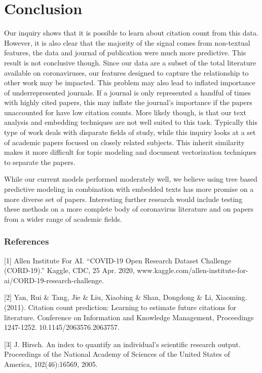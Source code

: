 \documentclass{article} %
\begin{document}
\section{Conclusion}
\label{conclusion}

Our inquiry shows that it is possible to learn about citation count from this data. However, it is also  clear that the majority of the signal comes from non-textual features, the data and journal of publication were much more predictive. This result is not conclusive though. Since our data are a subset of the total literature available on coronaviruses, our features designed to capture the relationship to other work may be impacted. This problem may also lead to inflated importance of underrepresented journals. If a journal is only represented a handful of times with highly cited papers, this may inflate the journal's importance if the papers unaccounted for have low citation counts. More likely though, is that our text analysis and embedding techniques are not well suited to this task. Typically this type of work deals with disparate fields of study, while this inquiry looks at a set of academic papers focused on closely related subjects. This inherit similarity makes it more difficult for topic modeling and document vectorization techniques to separate the papers.

While our current models performed moderately well, we believe using tree based predictive modeling in combination with embedded texts has more promise on a more diverse set of papers. Interesting further research would include testing these methods on a more complete body of coronavirus literature and on papers from a wider range of academic fields.

\newpage
\subsubsection*{References}

\small{
[1] Allen Institute For AI. “COVID-19 Open Research Dataset Challenge (CORD-19).” Kaggle, CDC, 25 Apr. 2020, www.kaggle.com/allen-institute-for-ai/CORD-19-research-challenge.

[2] Yan, Rui \& Tang, Jie \& Liu, Xiaobing \& Shan, Dongdong \& Li, Xiaoming. (2011). Citation count prediction: Learning to estimate future citations for literature. {\itInternational Conference on  Information and Knowledge Management, Proceedings} 1247-1252. 10.1145/2063576.2063757. 

[3] J. Hirsch. An index to quantify an individual’s scientific
research output. Proceedings of the National Academy of
Sciences of the United States of America, 102(46):16569,
2005.
}
\end{document}
